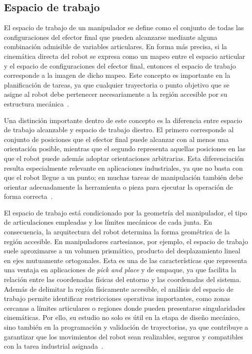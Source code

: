 \subsection{Espacio de trabajo}
El espacio de trabajo de un manipulador se define como el conjunto de todas las configuraciones del efector final que pueden alcanzarse mediante alguna combinación admisible de variables articulares. En forma más precisa, si la cinemática directa del robot se expresa como un mapeo entre el espacio articular y el espacio de configuraciones del efector final, entonces el espacio de trabajo corresponde a la imagen de dicho mapeo. Este concepto es importante en la planificación de tareas, ya que cualquier trayectoria o punto objetivo que se asigne al robot debe pertenecer necesariamente a la región accesible por su estructura mecánica~\cite{murray1994robotic}.

Una distinción importante dentro de este concepto es la diferencia entre espacio de trabajo alcanzable y espacio de trabajo diestro. El primero corresponde al conjunto de posiciones que el efector final puede alcanzar con al menos una orientación posible, mientras que el segundo representa aquellas posiciones en las que el robot puede además adoptar orientaciones arbitrarias. Esta diferenciación resulta especialmente relevante en aplicaciones industriales, ya que no basta con que el robot llegue a un punto; en muchas tareas de manipulación también debe orientar adecuadamente la herramienta o pieza para ejecutar la operación de forma correcta~\cite{lynch2017modern}.

El espacio de trabajo está condicionado por la geometría del manipulador, el tipo de articulaciones empleadas y los límites mecánicos de cada junta. En consecuencia, la arquitectura del robot determina la forma geométrica de la región accesible. En manipuladores cartesianos, por ejemplo, el espacio de trabajo suele aproximarse a un volumen prismático, producto del desplazamiento lineal en ejes mutuamente ortogonales. Esta es una de las características que representa una ventaja en aplicaciones de \textit{pick and place} y de empaque, ya que facilita la relación entre las coordenadas físicas del entorno y las coordenadas del sistema. Además de delimitar la región físicamente accesible, el análisis del espacio de trabajo permite identificar restricciones operativas importantes, como zonas cercanas a límites articulares o regiones donde pueden presentarse singularidades cinemáticas. Por ello, su estudio no solo es útil en la etapa de diseño mecánico, sino también en la programación y validación de trayectorias, ya que contribuye a garantizar que los movimientos del robot sean realizables, seguros y compatibles con la tarea industrial asignada~\cite{lynch2017modern,siegwart2011autonomous}.

